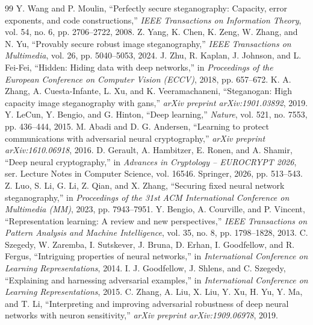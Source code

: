 \begin{thebibliography}{99}
Y. Wang and P. Moulin,
``Perfectly secure steganography: Capacity, error exponents, and code constructions,''
\emph{IEEE Transactions on Information Theory},
vol. 54, no. 6, pp. 2706--2722, 2008.
Z. Yang, K. Chen, K. Zeng, W. Zhang, and N. Yu,
``Provably secure robust image steganography,''
\emph{IEEE Transactions on Multimedia},
vol. 26, pp. 5040--5053, 2024.
J. Zhu, R. Kaplan, J. Johnson, and L. Fei-Fei,
``Hidden: Hiding data with deep networks,''
in \emph{Proceedings of the European Conference on Computer Vision (ECCV)},
2018, pp. 657--672.
K. A. Zhang, A. Cuesta-Infante, L. Xu, and K. Veeramachaneni,
``Steganogan: High capacity image steganography with gans,''
\emph{arXiv preprint arXiv:1901.03892}, 2019.
Y. LeCun, Y. Bengio, and G. Hinton,
``Deep learning,''
\emph{Nature}, vol. 521, no. 7553, pp. 436--444, 2015.
M. Abadi and D. G. Andersen,
``Learning to protect communications with adversarial neural cryptography,''
\emph{arXiv preprint arXiv:1610.06918}, 2016.
D. Gerault, A. Hambitzer, E. Ronen, and A. Shamir,
``Deep neural cryptography,''
in \emph{Advances in Cryptology -- EUROCRYPT 2026},
ser. Lecture Notes in Computer Science, vol. 16546.
Springer, 2026, pp. 513--543.
Z. Luo, S. Li, G. Li, Z. Qian, and X. Zhang,
``Securing fixed neural network steganography,''
in \emph{Proceedings of the 31st ACM International Conference on Multimedia (MM)},
2023, pp. 7943--7951.
Y. Bengio, A. Courville, and P. Vincent,
``Representation learning: A review and new perspectives,''
\emph{IEEE Transactions on Pattern Analysis and Machine Intelligence},
vol. 35, no. 8, pp. 1798--1828, 2013.
C. Szegedy, W. Zaremba, I. Sutskever, J. Bruna, D. Erhan,
I. Goodfellow, and R. Fergus,
``Intriguing properties of neural networks,''
in \emph{International Conference on Learning Representations}, 2014.
I. J. Goodfellow, J. Shlens, and C. Szegedy,
``Explaining and harnessing adversarial examples,''
in \emph{International Conference on Learning Representations}, 2015.
C. Zhang, A. Liu, X. Liu, Y. Xu, H. Yu, Y. Ma, and T. Li,
``Interpreting and improving adversarial robustness of deep neural networks with neuron sensitivity,''
\emph{arXiv preprint arXiv:1909.06978}, 2019.

\end{thebibliography}
